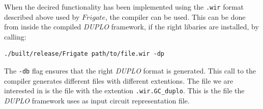 \documentclass[twoside,11pt,openright]{report}
\newcommand{\DUPLO}{\textit{DUPLO} }
\begin{document}
\bigskip

When the decired functionality has been implemented using the \verb|.wir| format described above used by $Frigate$, the compiler can be used. This can be done  from inside the compiled \DUPLO framework, if the right libaries are installed, by calling:

\begin{center}
\begin{verbatim}
./built/release/Frigate path/to/file.wir -dp
\end{verbatim}
\end{center}

The \verb|-db| flag ensures that the right \DUPLO format is generated. This call to the compiler generates different files with different extentions. The file we are interested in is the file with the extention \verb|.wir.GC_duplo|. This is the file the \DUPLO framework uses as input circuit representation file.

\bigskip
\end{document}
